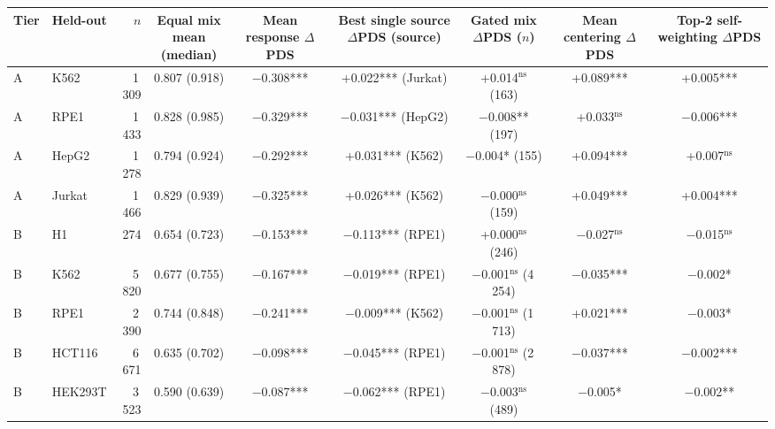 \documentclass[12pt]{article}
\begin{document}
\begin{singlespace}
\vspace{6pt}
{\scriptsize
\setlength{\tabcolsep}{3pt}
\renewcommand{\arraystretch}{1.05}
\begin{tabular}{@{}llrcccccc@{}}
\toprule
Tier & Held-out & $n$ & \makecell{Equal mix\\mean (median)} & \makecell{Mean response\\$\Delta$PDS} & \makecell{Best single source\\$\Delta$PDS (source)} & \makecell{Gated mix\\$\Delta$PDS ($n$)} & \makecell{Mean centering\\$\Delta$PDS} & \makecell{Top-2 self-\\weighting $\Delta$PDS} \\
\midrule
A & K562 & 1\,309 & 0.807 (0.918) & $-$0.308*** & +0.022*** (Jurkat) & +0.014$^{\mathrm{ns}}$ (163) & +0.089*** & +0.005*** \\
A & RPE1 & 1\,433 & 0.828 (0.985) & $-$0.329*** & $-$0.031*** (HepG2) & $-$0.008** (197) & +0.033$^{\mathrm{ns}}$ & $-$0.006*** \\
A & HepG2 & 1\,278 & 0.794 (0.924) & $-$0.292*** & +0.031*** (K562) & $-$0.004* (155) & +0.094*** & +0.007$^{\mathrm{ns}}$ \\
A & Jurkat & 1\,466 & 0.829 (0.939) & $-$0.325*** & +0.026*** (K562) & $-$0.000$^{\mathrm{ns}}$ (159) & +0.049*** & +0.004*** \\
\midrule
B & H1 & 274 & 0.654 (0.723) & $-$0.153*** & $-$0.113*** (RPE1) & +0.000$^{\mathrm{ns}}$ (246) & $-$0.027$^{\mathrm{ns}}$ & $-$0.015$^{\mathrm{ns}}$ \\
B & K562 & 5\,820 & 0.677 (0.755) & $-$0.167*** & $-$0.019*** (RPE1) & $-$0.001$^{\mathrm{ns}}$ (4\,254) & $-$0.035*** & $-$0.002* \\
B & RPE1 & 2\,390 & 0.744 (0.848) & $-$0.241*** & $-$0.009*** (K562) & $-$0.001$^{\mathrm{ns}}$ (1\,713) & +0.021*** & $-$0.003* \\
B & HCT116 & 6\,671 & 0.635 (0.702) & $-$0.098*** & $-$0.045*** (RPE1) & $-$0.001$^{\mathrm{ns}}$ (2\,878) & $-$0.037*** & $-$0.002*** \\
B & HEK293T & 3\,523 & 0.590 (0.639) & $-$0.087*** & $-$0.062*** (RPE1) & $-$0.003$^{\mathrm{ns}}$ (489) & $-$0.005* & $-$0.002** \\
\bottomrule
\end{tabular}
}

\clearpage


\end{singlespace}
\end{document}
